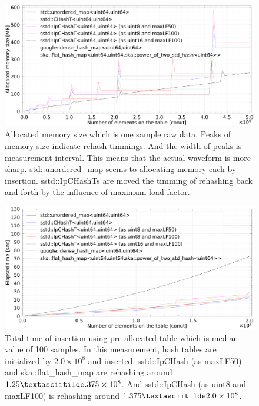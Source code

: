 \begin{figure}[h]
  \hspace{-1mm}
  \includegraphics[scale=0.24]{./fig_bench_sm/usedMemory.pdf}
  \caption{
    Allocated memory size which is one sample raw data.
    Peaks of memory size indicate rehash timmings.
    And the width of peaks is measurement interval.
    This means that the actual waveform is more sharp.
    std::unordered\_map seems to allocating memory each by insertion.
    sstd::IpCHashTs are moved the timming of rehashing back and forth by the influence of maximum load factor.
  }
  \label{fig_bench_memory}
\end{figure}


\begin{figure}[h]
  \includegraphics[scale=0.24]{./fig_bench_sm/insert_et_preAlloc_med.pdf}
  \caption{
    Total time of insertion using pre-allocated table which is median value of 100 samples.
    In this measurement, hash tables are initialized by $2.0\times10^8$ and inserted.
    sstd::IpCHash (as maxLF50) and ska::flat\_hash\_map are rehashing around $1.25\textasciitilde.375\times10^8$.
    And sstd::IpCHash (as uint8 and maxLF100) is rehashing around $1.375\textasciitilde2.0\times10^8$.
  }
  \label{fig_bench_insert_preAlloc_sm}
\end{figure}

